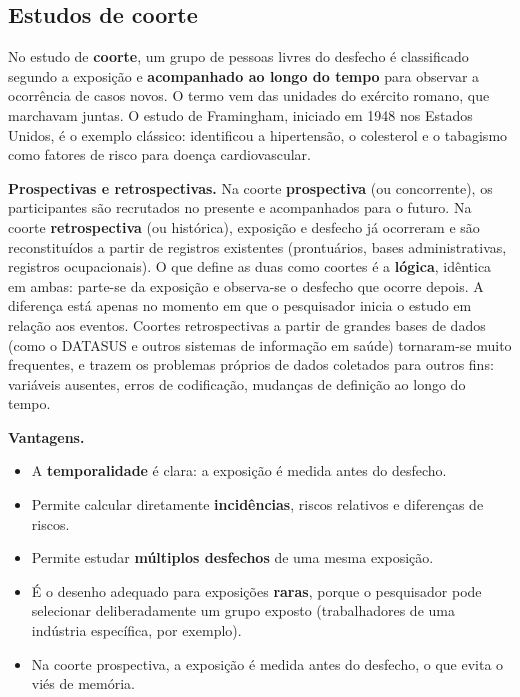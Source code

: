\documentclass[
]{book}
\providecommand{\tightlist}{%
  \setlength{\itemsep}{0pt}\setlength{\parskip}{0pt}}
\begin{document}
\subsection{Estudos de coorte}\label{estudos-de-coorte}

No estudo de \textbf{coorte}, um grupo de pessoas livres do desfecho é classificado segundo a exposição e \textbf{acompanhado ao longo do tempo} para observar a ocorrência de casos novos. O termo vem das unidades do exército romano, que marchavam juntas. O estudo de Framingham, iniciado em 1948 nos Estados Unidos, é o exemplo clássico: identificou a hipertensão, o colesterol e o tabagismo como fatores de risco para doença cardiovascular.

\textbf{Prospectivas e retrospectivas.} Na coorte \textbf{prospectiva} (ou concorrente), os participantes são recrutados no presente e acompanhados para o futuro. Na coorte \textbf{retrospectiva} (ou histórica), exposição e desfecho já ocorreram e são reconstituídos a partir de registros existentes (prontuários, bases administrativas, registros ocupacionais). O que define as duas como coortes é a \textbf{lógica}, idêntica em ambas: parte-se da exposição e observa-se o desfecho que ocorre depois. A diferença está apenas no momento em que o pesquisador inicia o estudo em relação aos eventos. Coortes retrospectivas a partir de grandes bases de dados (como o DATASUS e outros sistemas de informação em saúde) tornaram-se muito frequentes, e trazem os problemas próprios de dados coletados para outros fins: variáveis ausentes, erros de codificação, mudanças de definição ao longo do tempo.

\textbf{Vantagens.}

\begin{itemize}
\tightlist
\item
  A \textbf{temporalidade} é clara: a exposição é medida antes do desfecho.
\item
  Permite calcular diretamente \textbf{incidências}, riscos relativos e diferenças de riscos.
\item
  Permite estudar \textbf{múltiplos desfechos} de uma mesma exposição.
\item
  É o desenho adequado para exposições \textbf{raras}, porque o pesquisador pode selecionar deliberadamente um grupo exposto (trabalhadores de uma indústria específica, por exemplo).
\item
  Na coorte prospectiva, a exposição é medida antes do desfecho, o que evita o viés de memória.
\end{itemize}
\end{document}
